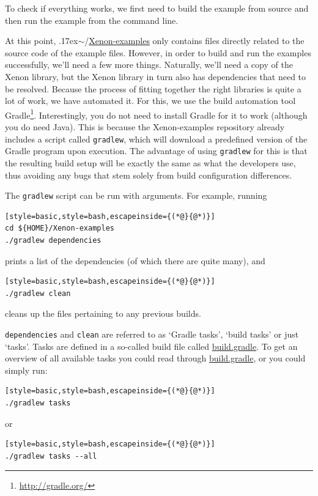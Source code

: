 \documentclass[12pt, a4paper, twoside, openany, titlepage]{book}
\newcommand{\mytilde}{\raise.17ex\hbox{$\scriptstyle\sim$}}
\begin{document}
To check if everything works, we first need to build the example from source and then run the example from the command line.

At this point, \mytilde/\url{Xenon-examples} only contains files directly related to the source code of the example files. However, in order to build and run the examples successfully, we'll need a few more things. Naturally, we'll need a copy of the Xenon library, but the Xenon library in turn also has dependencies that need to be resolved. Because the process of fitting together the right libraries is quite a lot of work, we have automated it. For this, we use the build automation tool Gradle\footnote{\url{http://gradle.org/}}. Interestingly, you do not need to install Gradle for it to work (although you do need Java). This is because the Xenon-examples repository already includes a script called \texttt{gradlew}, which will download a predefined version of the Gradle program upon execution. The advantage of using \texttt{gradlew} for this is that the resulting build setup will be exactly the same as what the developers use, thus avoiding any bugs that stem solely from build configuration differences.

The \texttt{gradlew} script can be run with arguments. For example, running
\begin{lstlisting}[style=basic,style=bash,escapeinside={(*@}{@*)}]
cd ${HOME}/Xenon-examples
./gradlew dependencies
\end{lstlisting} %
prints a list of the dependencies (of which there are quite many), and

\begin{lstlisting}[style=basic,style=bash,escapeinside={(*@}{@*)}]
./gradlew clean
\end{lstlisting} %
cleans up the files pertaining to any previous builds.

\texttt{dependencies} and \texttt{clean} are referred to as `Gradle tasks', `build tasks' or just `tasks'. Tasks are defined in a so-called build file called \url{build.gradle}. To get an overview of all available tasks you could read through \url{build.gradle}, or you could simply run:
\begin{lstlisting}[style=basic,style=bash,escapeinside={(*@}{@*)}]
./gradlew tasks
\end{lstlisting} %

or

\begin{lstlisting}[style=basic,style=bash,escapeinside={(*@}{@*)}]
./gradlew tasks --all
\end{lstlisting} %
\end{document}

